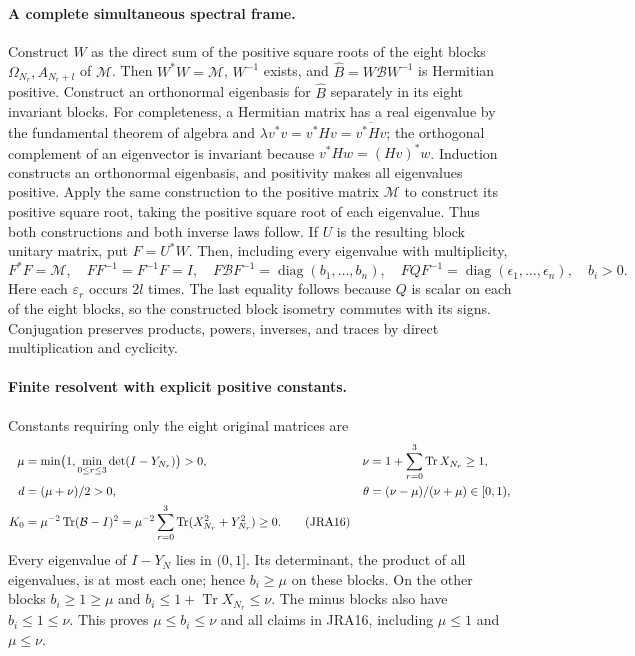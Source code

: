 \documentclass[11pt,a4paper]{article}
\newcommand{\Tr}{\operatorname{Tr}}
\newcommand{\diag}{\operatorname{diag}}
\begin{document}
\paragraph{A complete simultaneous spectral frame.}
Construct $W$ as the direct sum of the positive square roots of the eight
blocks $\Omega_{N_r},A_{N_r+l}$ of $\mathcal M$.
Then $W^*W=\mathcal M$, $W^{-1}$ exists, and
$\widehat B=W\mathcal BW^{-1}$ is Hermitian positive.
Construct an orthonormal eigenbasis for $\widehat B$ separately in its
eight invariant blocks. For completeness, a Hermitian matrix has a
real eigenvalue by the fundamental theorem of algebra and
$\lambda v^*v=v^*Hv=\overline{v^*Hv}$; the orthogonal complement of an
eigenvector is invariant because $v^*Hw=(Hv)^*w$. Induction constructs
an orthonormal eigenbasis, and positivity makes all eigenvalues positive.
Apply the same construction to the positive matrix $\mathcal M$ to
construct its positive square root, taking the positive square root of
each eigenvalue. Thus both constructions and both inverse laws follow.
If $U$ is the resulting block unitary matrix, put $F=U^*W$.
Then, including every eigenvalue with multiplicity,
\begin{equation}
 F^*F=\mathcal M,\quad FF^{-1}=F^{-1}F=I,\quad
 F\mathcal BF^{-1}=\diag(b_1,\ldots,b_n),\quad
 FQF^{-1}=\diag(\epsilon_1,\ldots,\epsilon_n),\quad b_i>0.
 \tag{JRA15}
\end{equation}
Here each $\varepsilon_r$ occurs $2l$ times. The last equality follows
because $Q$ is scalar on each of the eight blocks, so the constructed
block isometry commutes with its signs. Conjugation preserves products,
powers, inverses, and traces by direct multiplication and cyclicity.

\paragraph{Finite resolvent with explicit positive constants.}
Constants requiring only the eight original matrices are
\begin{align}
 \mu&=\min\bigl(1,\min_{0\leq r\leq3}\det(I-Y_{N_r})\bigr)>0,
 &\nu&=1+\sum_{r=0}^3\Tr X_{N_r}\geq1,\notag\\
 d&=(\mu+\nu)/2>0,
 &\theta&=(\nu-\mu)/(\nu+\mu)\in[0,1),\notag\\
 K_0&=\mu^{-2}\Tr(\mathcal B-I)^2
 =\mu^{-2}\sum_{r=0}^3\Tr(X_{N_r}^2+Y_{N_r}^2)\geq0.
 \tag{JRA16}
\end{align}
Every eigenvalue of $I-Y_N$ lies in $(0,1]$. Its determinant, the product
of all eigenvalues, is at most each one; hence $b_i\geq\mu$ on these
blocks. On the other blocks $b_i\geq1\geq\mu$ and
$b_i\leq1+\Tr X_{N_r}\leq\nu$. The minus blocks also have
$b_i\leq1\leq\nu$. This proves $\mu\leq b_i\leq\nu$ and all
claims in JRA16, including $\mu\leq1$ and $\mu\leq\nu$.
\end{document}
